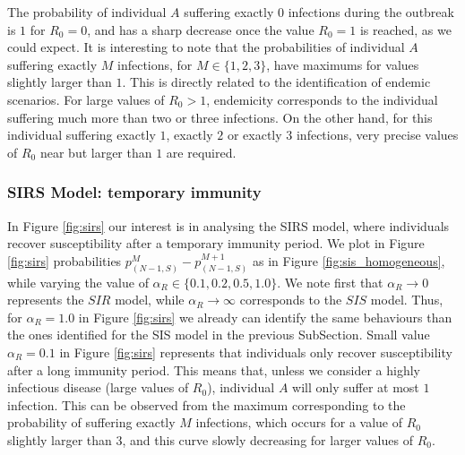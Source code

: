 \documentclass[preprint,12pt]{elsarticle}
\begin{document}
\par The probability of individual $A$ suffering exactly $0$ infections during the outbreak is $1$ for $R_0=0$, and has a sharp decrease once the value $R_0=1$ is reached, as we could expect. It is interesting to note that the probabilities of individual $A$ suffering exactly $M$ infections, for $M\in\{1,2,3\}$, have maximums for values slightly larger than $1$. This is directly related to the identification of endemic scenarios. For large values of $R_0>1$, endemicity corresponds to the individual suffering much more than two or three infections. On the other hand, for this individual suffering exactly $1$, exactly $2$ or exactly $3$ infections, very precise values of $R_0$ near but larger than $1$ are required. 

\subsubsection{SIRS Model: temporary immunity}

\par In Figure \ref{fig:sirs} our interest is in analysing the SIRS model, where individuals recover susceptibility after a temporary immunity period. We plot in Figure \ref{fig:sirs} probabilities $p_{(N-1,S)}^M-p_{(N-1,S)}^{M+1}$ as in Figure \ref{fig:sis_homogeneous}, while varying the value of $\alpha_R\in\{0.1,0.2,0.5,1.0\}$. We note first that $\alpha_R\rightarrow 0$ represents the $SIR$ model, while $\alpha_R\rightarrow\infty$ corresponds to the $SIS$ model. Thus, for $\alpha_R=1.0$ in Figure \ref{fig:sirs} we already can identify the same behaviours than the ones identified for the SIS model in the previous SubSection. Small value $\alpha_R=0.1$ in Figure \ref{fig:sirs} represents that individuals only recover susceptibility after a long immunity period. This means that, unless we consider a highly infectious disease (large values of $R_0$), individual $A$ will only suffer at most $1$ infection. This can be observed from the maximum corresponding to the probability of suffering exactly $M$ infections, which occurs for a value of $R_0$ slightly larger than $3$, and this curve slowly decreasing for larger values of $R_0$. 
\end{document}
